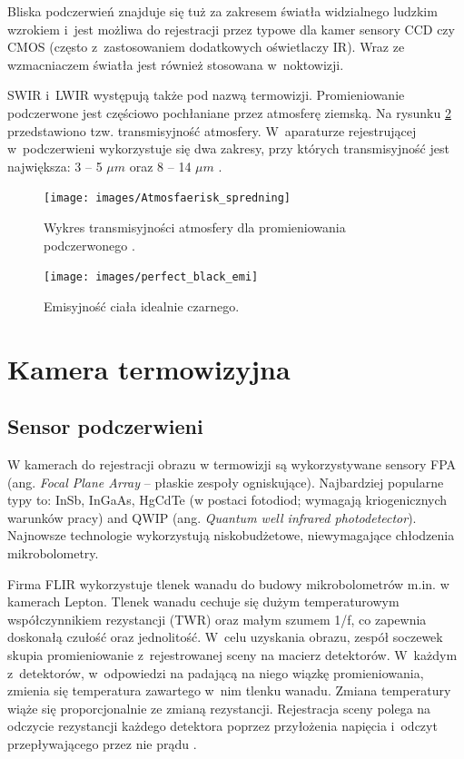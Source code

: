 Bliska podczerwień znajduje się tuż za zakresem światła widzialnego ludzkim wzrokiem i~jest możliwa do rejestracji przez typowe dla kamer sensory CCD czy CMOS (często z~zastosowaniem dodatkowych oświetlaczy IR). 
Wraz ze wzmacniaczem światła jest również stosowana w~noktowizji.

SWIR i~LWIR występują także pod nazwą termowizji. 
Promieniowanie podczerwone jest częściowo pochłaniane przez atmosferę ziemską. 
Na rysunku \ref{fig:atmosfera_int} przedstawiono tzw. transmisyjność atmosfery. 
W~aparaturze rejestrującej w~podczerwieni wykorzystuje się dwa zakresy, przy których transmisyjność jest największa: 3 -- 5 $\mu m$ oraz 8 -- 14 $\mu m$ \cite{niklaus2007mems}.


\begin{figure}
\centering
\texttt{[image: images/Atmosfaerisk\_spredning]}
\caption[Wykres transmisyjności atmosfery dla promieniowania podczerwonego ]{Wykres transmisyjności atmosfery dla promieniowania podczerwonego \cite{wiki:infrared}.}
\label{fig:perfect_black}
\end{figure}

\begin{figure}
\centering
\texttt{[image: images/perfect\_black\_emi]}
\caption[Emisyjność ciała idealnie czarnego]{Emisyjność ciała idealnie czarnego.}
\label{fig:atmosfera_int}
\end{figure}


\section{Kamera termowizyjna}

\subsection{Sensor podczerwieni}

W kamerach do rejestracji obrazu w termowizji są wykorzystywane sensory FPA (ang. \textit{Focal Plane Array} -- płaskie zespoły ogniskujące). 
Najbardziej popularne typy to: InSb, InGaAs, HgCdTe (w postaci fotodiod; wymagają kriogenicznych warunków pracy) and QWIP (ang. \textit{Quantum well infrared photodetector}). 
Najnowsze technologie wykorzystują niskobudżetowe, niewymagające chłodzenia mikrobolometry.

Firma FLIR wykorzystuje tlenek wanadu do budowy mikrobolometrów m.in. w kamerach Lepton. 
Tlenek wanadu cechuje się dużym temperaturowym współczynnikiem rezystancji (TWR) oraz małym szumem 1/f, co zapewnia doskonałą czułość oraz jednolitość. 
W~celu uzyskania obrazu, zespół soczewek skupia promieniowanie z~rejestrowanej sceny na macierz detektorów. 
W~każdym z~detektorów, w~odpowiedzi na padającą na niego wiązkę promieniowania, zmienia się temperatura zawartego w~nim tlenku wanadu. 
Zmiana temperatury wiąże się proporcjonalnie ze zmianą rezystancji. 
Rejestracja sceny polega na odczycie rezystancji każdego detektora poprzez przyłożenia napięcia i~odczyt przepływającego przez nie prądu \cite{flir:lepton}.

